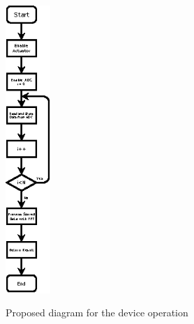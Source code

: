 \begin{figure}[!htb]
    \centering
    \includegraphics[width=0.15\textwidth]{Chapters/3CHP/Images/fluxogramArchProp.eps}
    \caption{Proposed diagram for the device operation}{}
    \label{fig:systemSWFlow}
\end{figure}

